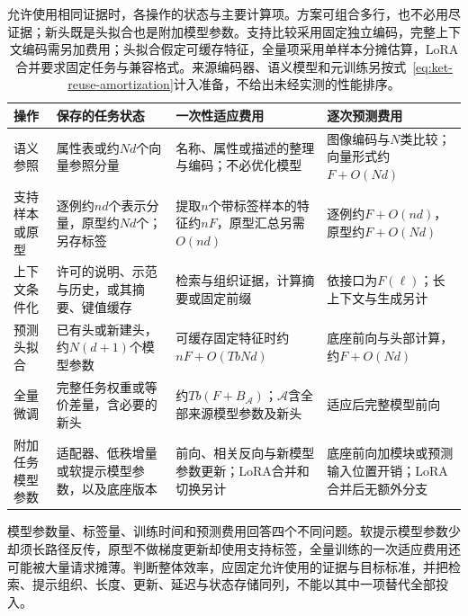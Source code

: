 \begin{table}[htbp]
  \centering
  \small
  \setlength{\tabcolsep}{4pt}
  \renewcommand{\arraystretch}{1.2}
  \begin{tabularx}{\linewidth}{@{}>{\raggedright\arraybackslash}p{24mm}
      >{\raggedright\arraybackslash}p{36mm}
      >{\raggedright\arraybackslash}X
      >{\raggedright\arraybackslash}X@{}}
    \toprule
    操作 & 保存的任务状态 & 一次性适应费用 & 逐次预测费用 \\
    \midrule
    语义参照 & 属性表或约$Nd$个向量参照分量 & 名称、属性或描述的整理与编码；不必优化模型 & 图像编码与$N$类比较；向量形式约$F+O(Nd)$ \\
    \addlinespace
    支持样本或原型 & 逐例约$nd$个表示分量，原型约$Nd$个；另存标签 & 提取$n$个带标签样本的特征约$nF$，原型汇总另需$O(nd)$ & 逐例约$F+O(nd)$，原型约$F+O(Nd)$ \\
    \addlinespace
    上下文条件化 & 许可的说明、示范与历史，或其摘要、键值缓存 & 检索与组织证据，计算摘要或固定前缀 & 依接口为$F(\ell)$；长上下文与生成另计 \\
    \addlinespace
    预测头拟合 & 已有头或新建头，约$N(d+1)$个模型参数 & 可缓存固定特征时约$nF+O(TbNd)$ & 底座前向与头部计算，约$F+O(Nd)$ \\
    \addlinespace
    全量微调 & 完整任务权重或等价差量，含必要的新头 & 约$Tb(F+B_{\mathcal A})$；$\mathcal A$含全部来源模型参数及新头 & 适应后完整模型前向 \\
    \addlinespace
    附加任务模型参数 & 适配器、低秩增量或软提示模型参数，以及底座版本 & 前向、相关反向与新模型参数更新；LoRA合并和切换另计 & 底座前向加模块或预测输入位置开销；LoRA合并后无额外分支 \\
    \bottomrule
  \end{tabularx}
  \caption{允许使用相同证据时，各操作的状态与主要计算项。方案可组合多行，也不必用尽证据；新头既是头拟合也是附加模型参数。支持比较采用固定独立编码，完整上下文编码需另加费用；头拟合假定可缓存特征，全量项采用单样本分摊估算，LoRA合并要求固定任务与兼容格式。来源编码器、语义模型和元训练另按式~\eqref{eq:ket-reuse-amortization}计入准备，不给出未经实测的性能排序。}
  \label{tab:ket-transfer-operation-cost}
\end{table}

模型参数量、标签量、训练时间和预测费用回答四个不同问题。软提示模型参数少却须长路径反传，原型不做梯度更新却使用支持标签，全量训练的一次适应费用还可能被大量请求摊薄。判断整体效率，应固定允许使用的证据与目标标准，并把检索、提示组织、长度、更新、延迟与状态存储同列，不能以其中一项替代全部投入。

